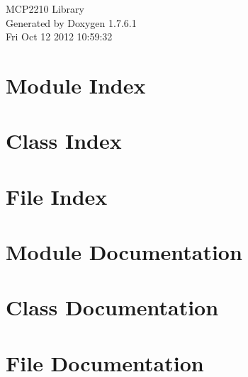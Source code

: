 \documentclass[a4paper]{book}
\begin{document}
\hypersetup{pageanchor=false,citecolor=blue}
\begin{titlepage}
\vspace*{7cm}
\begin{center}
{\Large \-M\-C\-P2210 \-Library }\\
\vspace*{1cm}
{\large \-Generated by Doxygen 1.7.6.1}\\
\vspace*{0.5cm}
{\small Fri Oct 12 2012 10:59:32}\\
\end{center}
\end{titlepage}
\clearemptydoublepage
{}
\tableofcontents
\clearemptydoublepage
{}
\hypersetup{pageanchor=true,citecolor=blue}
\chapter{\-Module \-Index}

\chapter{\-Class \-Index}

\chapter{\-File \-Index}

\chapter{\-Module \-Documentation}

\chapter{\-Class \-Documentation}











\chapter{\-File \-Documentation}






\printindex
\end{document}
